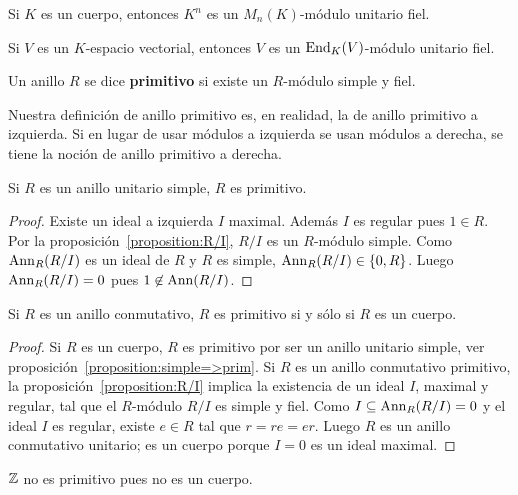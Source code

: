 \begin{example}
	Si $K$ es un cuerpo, entonces $K^n$ es un $M_n(K)$-módulo unitario fiel.
\end{example}

\begin{example}
	Si $V$ es un $K$-espacio vectorial, entonces $V$ es un $\operatorname{End}_K(V)$-módulo
	unitario fiel.
\end{example}

\begin{definition}
	Un anillo $R$ se dice \textbf{primitivo} si existe un $R$-módulo simple y
	fiel.
\end{definition}

Nuestra definición de anillo primitivo es, en realidad, la de anillo primitivo
a izquierda.  Si en lugar de usar módulos a izquierda se usan módulos a
derecha, se tiene la noción de anillo primitivo a derecha. 

\begin{proposition}
	\label{proposition:simple=>prim}
	Si $R$ es un anillo unitario simple, $R$ es primitivo.
\end{proposition}

\begin{proof}
	Existe un ideal a izquierda $I$ maximal. Además $I$ es regular pues $1\in R$.
	Por la proposición~\ref{proposition:R/I}, $R/I$ es un $R$-módulo
	simple. Como $\operatorname{Ann}_R(R/I)$ es un ideal de $R$ y $R$ es simple,
	$\operatorname{Ann}_R(R/I)\in\{0,R\}$. Luego $\operatorname{Ann}_R(R/I)=0$ pues $1\not\in\operatorname{Ann}(R/I)$.
\end{proof}

\begin{proposition}
	\label{proposition:prim+conm=cuerpo}
	Si $R$ es un anillo conmutativo, $R$ es primitivo si y sólo si $R$ es un
	cuerpo.
\end{proposition}

\begin{proof}
	Si $R$ es un cuerpo, $R$ es primitivo por ser un anillo unitario simple, ver 
	proposición~\ref{proposition:simple=>prim}. Si $R$ es un anillo
	conmutativo primitivo, la
	proposición~\ref{proposition:R/I} implica la existencia de un ideal $I$, 
	maximal y regular, tal que el $R$-módulo 
	$R/I$ es simple y fiel.
	Como $I\subseteq \operatorname{Ann}_R(R/I)=0$ y el ideal $I$ es regular, existe $e\in R$ tal
	que $r=re=er$. Luego $R$ es un anillo conmutativo unitario; es un cuerpo
	porque $I=0$ es un ideal maximal.
\end{proof}

\begin{example}
	$\mathbb{Z}$ no es primitivo pues no es un cuerpo.
\end{example}

